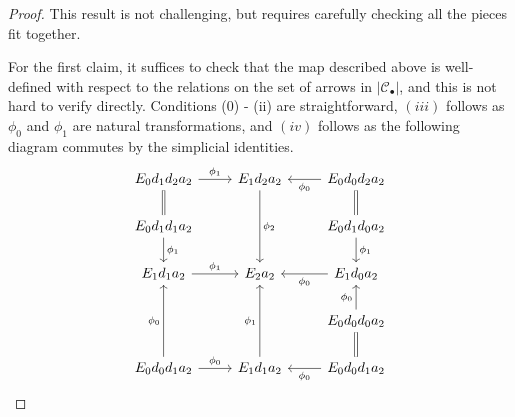 \documentclass[a4paper,10pt
,draft
]{article}%
\renewcommand{\1}{\eta}%
\begin{document}
\begin{proof}
      This result is not challenging, but requires carefully checking all the pieces fit together.
      
      For the first claim, it suffices to check that the map described above is well-defined with respect to the relations on the set of arrows in $|\mathcal C_\bullet|$, and this is not hard to verify directly.
      {\color{OliveGreen}
        Conditions (0) - (ii) are straightforward, $(iii)$ follows as $\phi_0$ and $\phi_1$ are natural transformations,
        and $(iv)$ follows as the following diagram commutes by the simplicial identities.
        \begin{equation}
              \begin{tikzcd}
                    E_0 d_1 d_2 a_2 \arrow[d, equal] \arrow[r, "\phi_1"]
                    &
                    E_1 d_2 a_2 \arrow[dd, "\phi_2"]
                    &
                    E_0 d_0 d_2 a_2 \arrow[d, equal] \arrow[l, "\phi_0"]
                    \\
                    E_0 d_1 d_1 a_2 \arrow[d, "\phi_1"]
                    &&
                    E_0 d_1 d_0 a_2 \arrow[d, "\phi_1"]
                    \\
                    E_1 d_1 a_2 \arrow[r, "\phi_1"]
                    &
                    E_2 a_2
                    &
                    E_1 d_0 a_2 \arrow[l, "\phi_0"]
                    \\
                    &&
                    E_0 d_0 d_0 a_2 \arrow[u, "\phi_0"] \arrow[d, equal]
                    \\
                    E_0 d_0 d_1 a_2 \arrow[uu, "\phi_0"] \arrow[r, "\phi_0"]
                    &
                    E_1 d_1 a_2 \arrow[uu, "\phi_1"]
                    &
                    E_0 d_0 d_1 a_2 \arrow[l, "\phi_0"]
              \end{tikzcd}
        \end{equation}
      }


\end{proof}
\end{document}
